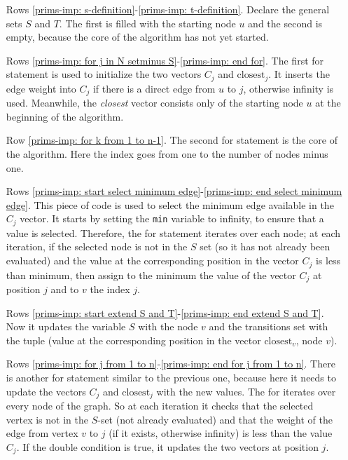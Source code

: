 \begin{itemize}
    \item[Rows \ref{prims-imp: s-definition}-\ref{prims-imp: t-definition}.] Declare the general sets $S$ and $T$. The first is filled with the starting node $u$ and the second is empty, because the core of the algorithm has not yet started.

    \item[Rows \ref{prims-imp: for j in N setminus S}-\ref{prims-imp: end for}.] The first for statement is used to initialize the two vectors $C_{j}$ and $\text{closest}_{j}$. It inserts the edge weight into $C_{j}$ if there is a direct edge from $u$ to $j$, otherwise infinity is used. Meanwhile, the \emph{closest} vector consists only of the starting node $u$ at the beginning of the algorithm.

    \item[Row \ref{prims-imp: for k from 1 to n-1}.] The second for statement is the core of the algorithm. Here the index goes from one to the number of nodes minus one.
    
    \item[Rows \ref{prims-imp: start select minimum edge}-\ref{prims-imp: end select minimum edge}.] This piece of code is used to select the minimum edge available in the $C_{j}$ vector. It starts by setting the \texttt{min} variable to infinity, to ensure that a value is selected. Therefore, the for statement iterates over each node; at each iteration, if the selected node is not in the $S$ set (so it has not already been evaluated) and the value at the corresponding position in the vector $C_{j}$ is less than minimum, then assign to the minimum the value of the vector $C_{j}$ at position $j$ and to $v$ the index $j$.

    \item[Rows \ref{prims-imp: start extend S and T}-\ref{prims-imp: end extend S and T}.] Now it updates the variable $S$ with the node $v$ and the transitions set with the tuple (value at the corresponding position in the vector $\text{closest}_{v}$, node $v$).

    \item[Rows \ref{prims-imp: for j from 1 to n}-\ref{prims-imp: end for j from 1 to n}.] There is another for statement similar to the previous one, because here it needs to update the vectors $C_{j}$ and $\text{closest}_{j}$ with the new values. The for iterates over every node of the graph. So at each iteration it checks that the selected vertex is not in the $S$-set (not already evaluated) and that the weight of the edge from vertex $v$ to $j$ (if it exists, otherwise infinity) is less than the value $C_{j}$. If the double condition is true, it updates the two vectors at position $j$.
\end{itemize}
